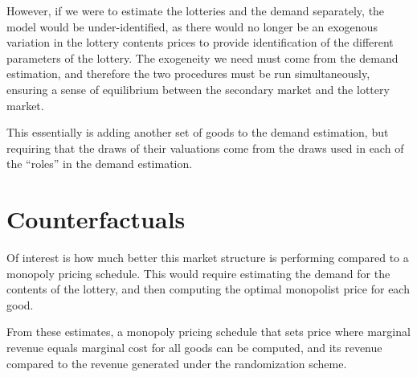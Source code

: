 \documentclass[12pt]{paper}
\begin{document}
However, if we were to estimate the lotteries and the demand
separately, the model would be under-identified, as there would no
longer be an exogenous variation in the lottery contents prices to
provide identification of the different parameters of the lottery. The
exogeneity we need must come from the demand estimation, and therefore
the two procedures must be run simultaneously, ensuring a sense of
equilibrium between the secondary market and the lottery market. 

This essentially is adding another set of goods to the demand
estimation, but requiring that the draws of their valuations come from
the draws used in each of the ``roles'' in the demand estimation. 



\section{Counterfactuals}

Of interest is how much better this market structure is performing
compared to a monopoly pricing schedule. This would require estimating
the demand for the contents of the lottery, and then computing the
optimal monopolist price for each good. 


From these estimates, a monopoly pricing schedule that sets price
where marginal revenue equals marginal cost for all goods can be
computed, and its revenue compared to the revenue generated under the
randomization scheme.



{}
\end{document}
